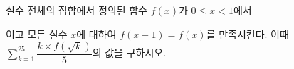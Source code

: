 \hspace*{2mm}\begin{minipage}[t]{\dimexpr\linewidth-2mm\relax}\vspace{0pt}
실수 전체의 집합에서 정의된 함수 $f(x)$가 $0\le x<1$에서 \par\smallskip{}\par\smallskip\noindent 이고 모든 실수 $x$에 대하여 $f(x+1)=f(x)$를 만족시킨다. 이때 $\displaystyle\sum_{k=1}^{25}\dfrac{k\times f(\sqrt{k})}{5}$의 값을 구하시오.\end{minipage}
